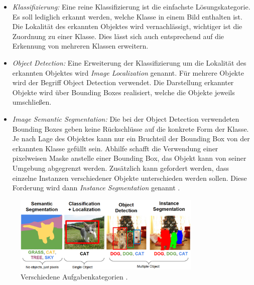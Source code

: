 \begin{itemize}
	\item \textit{Klassifizierung:}
	Eine reine Klassifizierung ist die einfachste Lösungskategorie. 
	Es soll lediglich erkannt werden, welche Klasse in einem Bild enthalten ist.
	Die Lokalität des erkannten Objektes wird vernachlässigt, wichtiger ist die Zuordnung zu einer Klasse.
	Dies lässt sich auch entsprechend auf die Erkennung von mehreren Klassen erweitern.
	
	\item \textit{Object Detection:}
	Eine Erweiterung der Klassifizierung um die Lokalität des erkannten Objektes wird \textit{Image Localization} genannt.
	Für mehrere Objekte wird der Begriff Object Detection verwendet.
	Die Darstellung erkannter Objekte wird über Bounding Boxes realisiert, welche die Objekte jeweils umschließen.

	\item \textit{Image Semantic Segmentation:}
	Die bei der Object Detection verwendeten Bounding Boxes geben keine Rückschlüsse auf die konkrete Form der Klasse.
	Je nach Lage des Objektes kann nur ein Bruchteil der Bounding Box von der erkannten Klasse gefüllt sein.
	Abhilfe schafft die Verwendung einer pixelweisen Maske anstelle einer Bounding Box, das Objekt kann von seiner Umgebung abgegrenzt werden.
	Zusätzlich kann gefordert werden, dass einzelne Instanzen verschiedener Objekte unterschieden werden sollen.
	Diese Forderung wird dann \textit{Instance Segmentation} genannt \cite{Sharma.21.08.2019}.
\end{itemize}

\begin{figure}
	\centering
	\includegraphics[width=0.8\textwidth]{Bilder/categories.png} 
	\caption{Verschiedene Aufgabenkategorien \cite{.10.11.2022}.}
	\label{fig:categories}
\end{figure} 



